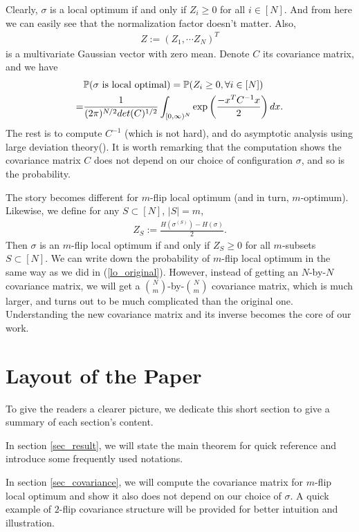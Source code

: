 \documentclass[10pt]{article}
\newcommand{\p}{\mathbb{P}}
\newenvironment{Proof of lemma}{\noindent{\bf Proof of Lemma}}{\hfill$\Box$\newline}
\newenvironment{Proof of claim}{\noindent{\bf Proof of claim}}{\hfill$\Box$\newline}
\newenvironment{Proof of theorem}{\noindent{\bf Proof of Theorem}}{\hfill\scriptsize{$\Box$}\newline}
\newenvironment{Proof of theorems}{\noindent{\bf Proof of Theorems}}{\hfill$\Box$\newline}
\newenvironment{Proof of proposition}{\noindent{\bf Proof of Proposition}}{\hfill$\Box$\newline}
\newenvironment{Proof of propositions}{\noindent{\bf Proof of Propositions}}{\hfill$\Box$\newline}
\newenvironment{Proof of exercise}{\noindent{\it Proof of Exercise:}}{\hfill$\Box$}
\numberwithin{equation}{section}
\begin{document}
Clearly, $\sigma$ is a local optimum if and only if $Z_i \geq 0$ for all $i \in [N]$. And from here we can easily see that the normalization factor doesn't matter. Also,
\begin{align}
    Z := (Z_1,\cdots Z_N)^T
\end{align}
is a multivariate Gaussian vector with zero mean. Denote $C$ its covariance matrix, and we have
\begin{align} \label{lo_original}
    &\p(\text{\normalfont $\sigma$ is local optimal}) = \p(Z_i \geq 0, \forall i \in [N]) \nonumber \\
    =&\frac{1}{(2\pi)^{N/2}det(C)^{1/2}}\int_{[0,\infty)^N} \exp \left(\frac{-x^T C^{-1} x}{2}\right)dx.
\end{align}
The rest is to compute $C^{-1}$ (which is not hard), and do asymptotic analysis using large deviation theory(\cite{SK_optimal}). It is worth remarking that the computation shows the covariance matrix $C$ does not depend on our choice of configuration $\sigma$, and so is the probability.

The story becomes different for $m$-flip local optimum (and in turn, $m$-optimum). Likewise, we define for any $S \subset [N]$, $|S|=m$,
\begin{align} \label{zs_formula}
    Z_S := \frac{H(\sigma^{(S)})- H(\sigma)}{2}.
\end{align}
Then $\sigma$ is an $m$-flip local optimum if and only if $Z_S \geq 0$ for all $m$-subsets $S \subset [N]$. We can write down the probability of $m$-flip local optimum in the same way as we did in (\ref{lo_original}). However, instead of getting an $N$-by-$N$ covariance matrix, we will get a $\binom{N}{m}$-by-$\binom{N}{m}$ covariance matrix, which is much larger, and turns out to be much complicated than the original one. Understanding the new covariance matrix and its inverse becomes the core of our work.

\section{Layout of the Paper} \label{sec_layout}
To give the readers a clearer picture, we dedicate this short section to give a summary of each section's content.

In section \ref{sec_result}, we will state the main theorem for quick reference and introduce some frequently used notations.

In section \ref{sec_covariance}, we will compute the covariance matrix for $m$-flip local optimum and show it also does not depend on our choice of $\sigma$. A quick example of $2$-flip covariance structure will be provided for better intuition and illustration.
\end{document}
